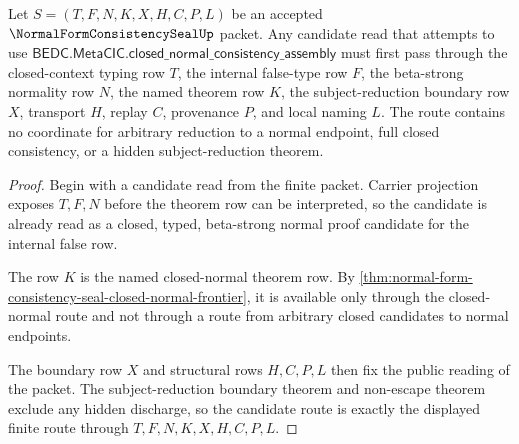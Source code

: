 \begin{theorem}
\label{thm:normal-form-consistency-seal-candidate-route}
Let $S=(T,F,N,K,X,H,C,P,L)$ be an accepted
$\NormalFormConsistencySealUp$ packet. Any candidate read that attempts to use
$\mathsf{BEDC.MetaCIC.closed\_normal\_consistency\_assembly}$ must first pass
through the closed-context typing row $T$, the internal false-type row $F$, the
beta-strong normality row $N$, the named theorem row $K$, the
subject-reduction boundary row $X$, transport $H$, replay $C$, provenance $P$,
and local naming $L$. The route contains no coordinate for arbitrary reduction
to a normal endpoint, full closed consistency, or a hidden subject-reduction
theorem.
\end{theorem}
\begin{proof}
Begin with a candidate read from the finite packet. Carrier projection exposes
$T,F,N$ before the theorem row can be interpreted, so the candidate is already
read as a closed, typed, beta-strong normal proof candidate for the internal
false row.

The row $K$ is the named closed-normal theorem row. By
\autoref{thm:normal-form-consistency-seal-closed-normal-frontier}, it is
available only through the closed-normal route and not through a route from
arbitrary closed candidates to normal endpoints.

The boundary row $X$ and structural rows $H,C,P,L$ then fix the public reading
of the packet. The subject-reduction boundary theorem and non-escape theorem
exclude any hidden discharge, so the candidate route is exactly the displayed
finite route through $T,F,N,K,X,H,C,P,L$.
\end{proof}

